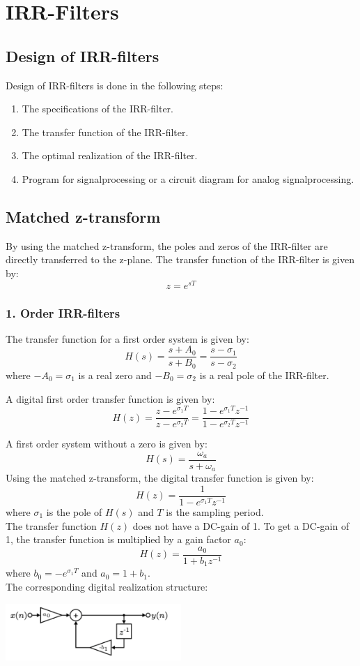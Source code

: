 \section{IRR-Filters}
\subsection{Design of IRR-filters}
Design of IRR-filters is done in the following steps:
\begin{enumerate}
  \item The specifications of the IRR-filter.
  \item The transfer function of the IRR-filter.
  \item The optimal realization of the IRR-filter.
  \item Program for signalprocessing or a circuit diagram for analog
    signalprocessing.
\end{enumerate}
\subsection{Matched z-transform}
By using the matched z-transform, the poles and zeros of the IRR-filter are directly transferred to the z-plane. The transfer function of the IRR-filter is given by:
$$z=e^{sT}$$
\subsubsection{1. Order IRR-filters}
The transfer function for a first order system is given by:
$$H(s)={\frac{s+A_{0}}{s+B_{0}}}={\frac{s-\sigma_{1}}{s-\sigma_{2}}}$$
where $-A_{0}=\sigma_1$ is a real zero and $-B_{0}=\sigma_2$ is a real pole of the IRR-filter.

A digital first order transfer function is given by:
$$H(z)={\frac{z-e^{\sigma_1 T}}{z-e^{\sigma_2 T}}}=\frac{1-e^{\sigma_1 T}z^{-1}}{1-e^{\sigma_2 T}z^{-1}}$$

A first order system without a zero is given by:
$$H(s)=\frac{\omega_a}{s+\omega_a}$$
Using the matched z-transform, the digital transfer function is given by:
$$H(z)=\frac{1}{1-e^{\sigma_1 T}z^{-1}}$$
where $\sigma_1$ is the pole of $H(s)$ and $T$ is the sampling period.\\
The transfer function $H(z)$ does not have a DC-gain of 1. To get a DC-gain of 1, the transfer function is multiplied by a gain factor $a_0$:
$$H(z)=\frac{a_0}{1+b_1z^{-1}}$$
where $b_0=-e^{\sigma_1 T}$ and $a_0=1+b_1$.\\
The corresponding digital realization structure:
\begin{center}
  \includegraphics[width=0.5\textwidth]{Images/Matched-z-1th.png}
\end{center}
